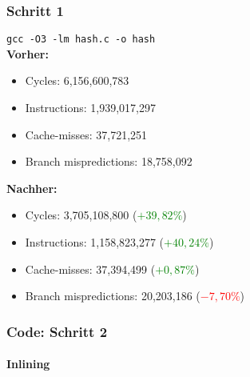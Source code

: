 \documentclass{beamer}
\newcommand{\success}[1]{\textcolor{green}{#1}}
\newcommand{\fail}[1]{\textcolor{red}{#1}}
\begin{document}
  \begin{frame}
  	\frametitle{Schritt 1}
  	\texttt{gcc -O3 -lm hash.c -o hash}\\[1em]
  	\textbf{Vorher:}
  	\begin{itemize}
			\item Cycles: 6,156,600,783\\
			\item Instructions: 1,939,017,297\\
			\item Cache-misses: 37,721,251\\
			\item Branch mispredictions: 18,758,092\\
		\end{itemize}

		\textbf{Nachher:}
  	\begin{itemize}
			\item Cycles: 3,705,108,800 (\success{$+ 39,82 \%$})\\
			\item Instructions: 1,158,823,277 (\success{$+ 40,24 \%$})\\
			\item Cache-misses: 37,394,499 (\success{$+ 0,87 \%$})\\
			\item Branch mispredictions: 20,203,186 (\fail{$- 7,70 \%$})\\
		\end{itemize}
  \end{frame}

	\begin{frame}
  	\frametitle{Code: Schritt 2}
		\framesubtitle{Inlining}
		\sInlining
  \end{frame}
\end{document}
